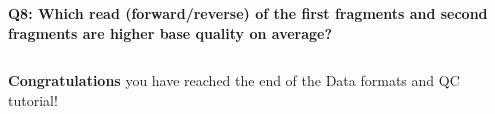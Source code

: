\documentclass[11pt]{article}
\makeatletter
\newcommand{\boxspacing}{\kern\kvtcb@left@rule\kern\kvtcb@boxsep}
\newcommand{\prompt}[4]{
        \ttfamily\llap{{\color{#2}\LARGE\faKeyboardO\hspace{3pt}#4}}\vspace{-\baselineskip}
    }
\makeatother
\begin{document}
    \textbf{Q8: Which read (forward/reverse) of the first fragments and
second fragments are higher base quality on average?}

    \begin{tcolorbox}[breakable, size=fbox, boxrule=1pt, pad at break*=1mm,colback=cellbackground, colframe=cellborder]
\prompt{In}{incolor}{ }{\boxspacing}
\begin{Verbatim}[commandchars=\\\{\}]

\end{Verbatim}
\end{tcolorbox}

    \textbf{Congratulations} you have reached the end of the Data formats
and QC tutorial!


\end{document}
